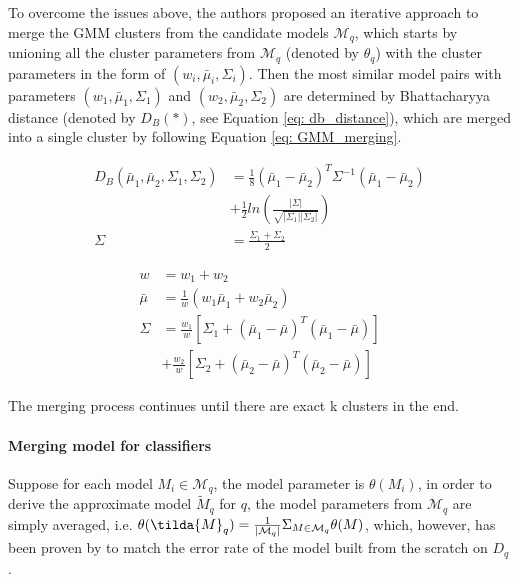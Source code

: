 To overcome the issues above, the authors proposed an iterative approach to merge the GMM clusters from the candidate models $\mathcal{M}_q$, which starts by unioning all the cluster parameters from $\mathcal{M}_q$ (denoted by $\theta_q$) with the cluster parameters in the form of $(w_i, \bar{\mu}_i, \Sigma_i)$.
Then the most similar model pairs with parameters $(w_1, \bar{\mu}_1, \Sigma_1)$ and $(w_2, \bar{\mu}_2, \Sigma_2)$ are determined by Bhattacharyya distance \cite{bhattacharyya1943measure} (denoted by $D_B(*)$, see Equation \ref{eq: db_distance}), which are merged into a single cluster by following Equation \ref{eq: GMM_merging}.

\begin{equation}\label{eq: db_distance}
\begin{split}
    D_B(\bar{\mu}_1, \bar{\mu}_2, \Sigma_1, \Sigma_2) &=
    \frac{1}{8}(\bar{\mu}_1-\bar{\mu}_2)^T\Sigma^{-1}(\bar{\mu}_1 -\bar{\mu}_2) \\&+ \frac{1}{2}ln(\frac{|\Sigma|}{\sqrt{|\Sigma_1||\Sigma_2|}})\\
    \Sigma &= \frac{\Sigma_1 + \Sigma_2}{2}
\end{split}
\end{equation}

\begin{equation}\label{eq: GMM_merging}
    \begin{split}
        w &= w_1 + w_2\\
        \bar{\mu} &= \frac{1}{w}(w_1\bar{\mu}_1 + w_2\bar{\mu}_2)\\
        \Sigma &= \frac{w_1}{w}[\Sigma_1 + (\bar{\mu}_1 - \bar{\mu})^T(\bar{\mu}_1 -\bar{\mu})]\\
        &+\frac{w_2}{w}[\Sigma_2 + (\bar{\mu}_2 - \bar{\mu})^T(\bar{\mu}_2 -\bar{\mu})]
    \end{split}
\end{equation}

The merging process continues until there are exact k clusters in the end.


\paragraph{Merging model for classifiers}
Suppose for each model $M_i \in \mathcal{M}_q$, the model parameter is $\theta(M_i)$, in order to derive the approximate model $\tilde{M}_q$ for $q$, the model parameters from $\mathcal{M}_q$ are simply averaged, i.e. $\theta(\tilda{M}_q) = \frac{1}{|\mathcal{M}_q|}\Sigma_{M \in \mathcal{M}_q}\theta(M)$, which, however, has been proven by \cite{zhang2012communication} to match the error rate of the model built from the scratch on $D_q$.

